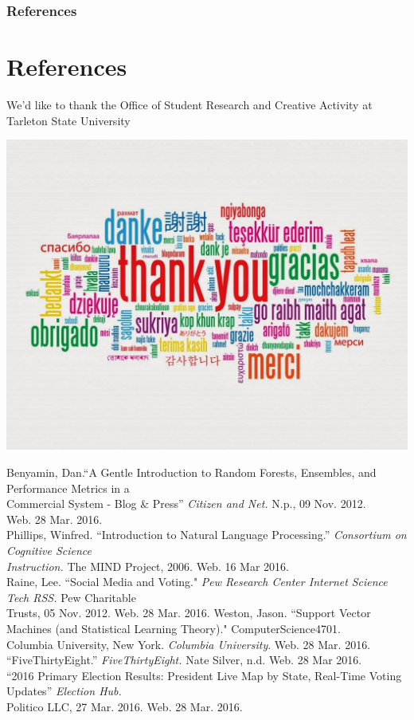 \documentclass[xcolor=dvipsnames]{beamer}
\begin{document}
\begin{frame}
\frametitle{References}
\section{References}
\small{We'd like to thank the Office of Student Research and Creative Activity at Tarleton State University}
\begin{center}
\includegraphics[scale=.10]{images/thank-you}
\end{center}
\tiny
\noindent Benyamin, Dan.``A Gentle Introduction to Random Forests, Ensembles, and Performance Metrics in a \\
\hspace{1cm}Commercial System - Blog \& Press''  \textit{Citizen and Net.} N.p., 09 Nov. 2012. \\
\hspace{1cm}Web. 28 Mar. 2016. \\
Phillips, Winfred.  ``Introduction to Natural Language Processing.'' \textit{Consortium on Cognitive Science} \\
\hspace{1cm}\textit{Instruction.} The MIND Project, 2006.  Web.  16 Mar 2016. \\
Raine, Lee. ``Social Media and Voting." \textit{Pew Research Center Internet} \textit{Science Tech RSS.} Pew Charitable \\
\hspace{1cm}Trusts, 05 Nov. 2012. Web. 28 Mar. 2016.
Weston, Jason. ``Support Vector Machines (and Statistical Learning Theory)." ComputerScience4701. \\
\hspace{1cm}Columbia University, New York. \textit{Columbia University}. Web. 28 Mar. 2016.\\
``FiveThirtyEight.'' \textit{FiveThirtyEight.} Nate Silver, n.d. Web.  28 Mar 2016. \\
``2016 Primary Election Results: President Live Map by State, Real-Time Voting Updates'' \textit{Election Hub.} \\ 
\hspace{1cm}Politico LLC, 27 Mar. 2016.  Web.  28 Mar. 2016. \\
\end{frame}
\end{document}

